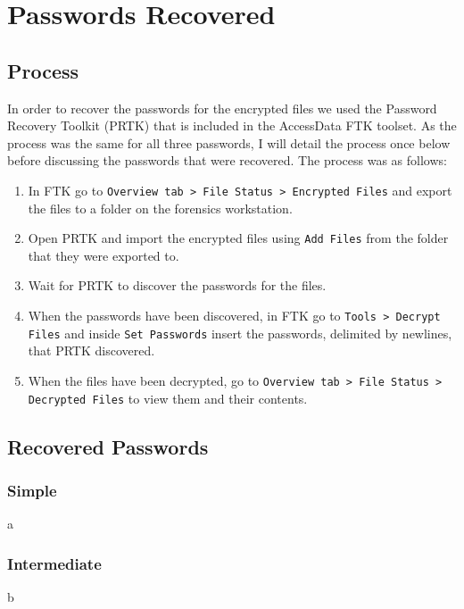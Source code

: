 \pagebreak
\section{Passwords Recovered}
\subsection{Process}
In order to recover the passwords for the encrypted files we used the Password Recovery Toolkit (PRTK) that is included in the AccessData FTK toolset. As the process was the same for all three passwords, I will detail the process once below before discussing the passwords that were recovered. The process was as follows:
\begin{enumerate}
  \item In FTK go to \texttt{Overview tab > File Status > Encrypted Files} and export the files to a folder on the forensics workstation.
  \item Open PRTK and import the encrypted files using \texttt{Add Files} from the folder that they were exported to.
  \item Wait for PRTK to discover the passwords for the files.
  \item When the passwords have been discovered, in FTK go to \texttt{Tools > Decrypt Files} and inside \texttt{Set Passwords} insert the passwords, delimited by newlines, that PRTK discovered.
  \item When the files have been decrypted, go to \texttt{Overview tab > File Status > Decrypted Files} to view them and their contents.
\end{enumerate}

\subsection{Recovered Passwords}
\subsubsection{Simple}
a
\subsubsection{Intermediate}
b
